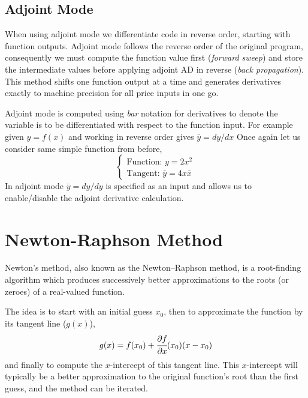 \documentclass[12pt,a4paper]{book}
\begin{document}
\subsection{Adjoint Mode}
When using adjoint mode we differentiate code in reverse order, starting with function outputs. 
Adjoint mode follows the reverse order of the original program, consequently we must compute the function value first (\emph{forward sweep}) and store the intermediate values before applying adjoint AD in reverse (\emph{back propagation}). This method shifts one function output at a time and generates derivatives exactly to machine precision for all price inputs in one go.

Adjoint mode is computed using \emph{bar} notation for derivatives to denote the variable is to be differentiated with respect to the function input. For example given $y = f(x)$ and working in reverse order gives $\bar{y} = dy/dx$
Once again let us consider same simple function from before,
\begin{equation}
\begin{cases}
\text{Function: } y = 2x^2\\
\text{Tangent: } \bar{y} = 4x\bar{x}
\end{cases}
\end{equation}
In adjoint mode $\bar{y} = dy/dy$ is specified as an input and allows us to enable/disable the adjoint derivative calculation. 

\section{Newton-Raphson Method}
Newton's method, also known as the Newton–Raphson method, is a root-finding algorithm which produces successively better approximations to the roots (or zeroes) of a real-valued function. %

The idea is to start with an initial guess $x_0$, then to approximate the function by its tangent line ($g(x)$), 
\begin{equation*}
g(x) = f(x_0) + \cfrac{\partial f}{\partial x}(x_0)(x - x_0)
\end{equation*}
and finally to compute the $x$-intercept of this tangent line. This $x$-intercept will typically be a better approximation to the original function's root than the first guess, and the method can be iterated.
\end{document}
